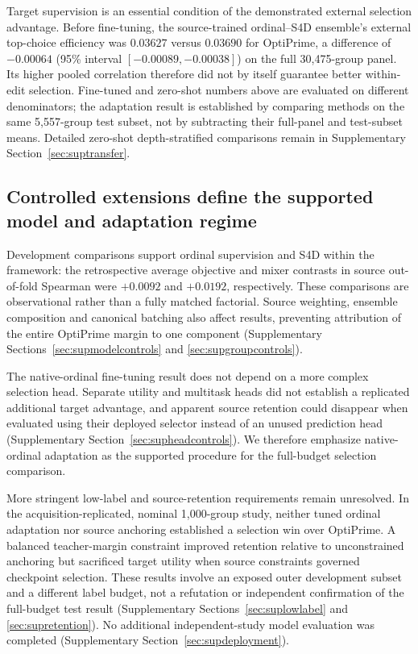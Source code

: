 Target supervision is an essential condition of the demonstrated external selection advantage. Before fine-tuning, the source-trained ordinal--S4D ensemble's external top-choice efficiency was $0.03627$ versus $0.03690$ for OptiPrime, a difference of $-0.00064$ (95\% interval $[-0.00089,-0.00038]$) on the full 30,475-group panel. Its higher pooled correlation therefore did not by itself guarantee better within-edit selection. Fine-tuned and zero-shot numbers above are evaluated on different denominators; the adaptation result is established by comparing methods on the same 5,557-group test subset, not by subtracting their full-panel and test-subset means. Detailed zero-shot depth-stratified comparisons remain in Supplementary Section~\ref{sec:suptransfer}.

\subsection{Controlled extensions define the supported model and adaptation regime}
Development comparisons support ordinal supervision and S4D within the framework: the retrospective average objective and mixer contrasts in source out-of-fold Spearman were $+0.0092$ and $+0.0192$, respectively. These comparisons are observational rather than a fully matched factorial. Source weighting, ensemble composition and canonical batching also affect results, preventing attribution of the entire OptiPrime margin to one component (Supplementary Sections~\ref{sec:supmodelcontrols} and \ref{sec:supgroupcontrols}).

The native-ordinal fine-tuning result does not depend on a more complex selection head. Separate utility and multitask heads did not establish a replicated additional target advantage, and apparent source retention could disappear when evaluated using their deployed selector instead of an unused prediction head (Supplementary Section~\ref{sec:supheadcontrols}). We therefore emphasize native-ordinal adaptation as the supported procedure for the full-budget selection comparison.

More stringent low-label and source-retention requirements remain unresolved. In the acquisition-replicated, nominal 1,000-group study, neither tuned ordinal adaptation nor source anchoring established a selection win over OptiPrime. A balanced teacher-margin constraint improved retention relative to unconstrained anchoring but sacrificed target utility when source constraints governed checkpoint selection. These results involve an exposed outer development subset and a different label budget, not a refutation or independent confirmation of the full-budget test result (Supplementary Sections~\ref{sec:suplowlabel} and \ref{sec:supretention}). No additional independent-study model evaluation was completed (Supplementary Section~\ref{sec:supdeployment}).
\FloatBarrier
